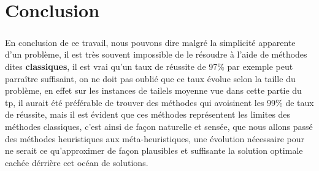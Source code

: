 \chapter*{Conclusion}
\paragraph{}
En conclusion de ce travail, nous pouvons dire malgré la simplicité apparente d'un problème, il est très souvent impossible de le résoudre à l'aide de méthodes dites \textbf{classiques}, il est vrai qu'un taux de réussite de 97\% par exemple peut parraître suffisaint, on ne doit pas oublié que ce taux évolue selon la taille du problème, en effet sur les instances de tailels moyenne vue dans cette partie du tp, il aurait été préférable de trouver des méthodes qui avoisinent les 99\% de taux de réussite, mais il est évident que ces méthodes représentent les limites des méthodes classiques, c'est ainsi de façon naturelle et sensée, que nous allons passé des méthodes heuristiques aux méta-heuristiques, une évolution nécessaire pour ne serait ce qu'approximer de façon plausibles et suffisante la solution optimale cachée dérrière cet océan de solutions.